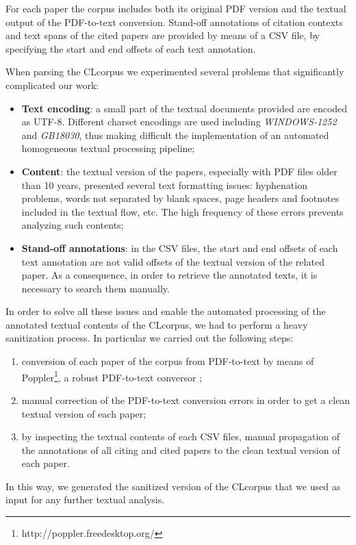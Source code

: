 \documentclass[11pt]{article}
\begin{document}
For each paper the corpus includes both its original PDF version and the textual output of the PDF-to-text conversion. Stand-off annotations of citation contexts and text spans of the cited papers are provided by means of a CSV file, by specifying the start and end offsets of each text annotation.


When parsing the CLcorpus we experimented several problems that significantly complicated our work:
 \begin{itemize}
 \item \textbf{Text encoding}: a small part of the textual documents provided are encoded as UTF-8. Different charset encodings are used including \textit{WINDOWS-1252} and \textit{GB18030}, thus making difficult the implementation of an automated homogeneous textual processing pipeline;
 \item \textbf{Content}: the textual version of the papers, especially with PDF files older than 10 years, presented several text formatting issues: hyphenation problems, words not separated by blank spaces, page headers and footnotes included in the textual flow, etc. The high frequency of these errors prevents analyzing such contents;
 \item \textbf{Stand-off annotations}: in the CSV files, the start and end offsets of each text annotation are not valid offsets of the textual version of the related paper. As a consequence, in order to retrieve the annotated texts, it is necessary to search them manually. 
 \end{itemize}

In order to solve all these issues and enable the automated processing of the annotated textual contents of the CLcorpus, we had to perform a heavy sanitization process. In particular we carried out the following steps:
\begin{enumerate}
\item conversion of each paper of the corpus from PDF-to-text by means of Poppler\footnote{http://poppler.freedesktop.org/}, a robust PDF-to-text conversor ;
\item manual correction of the PDF-to-text conversion errors in order to get a clean textual version of each paper;
\item by inspecting the textual contents of each CSV files, manual propagation of the annotations of all citing and cited papers to the clean textual version of each paper.
\end{enumerate}
In this way, we generated the sanitized version of the CLcorpus that we used as input for any further textual analysis.
\end{document}
